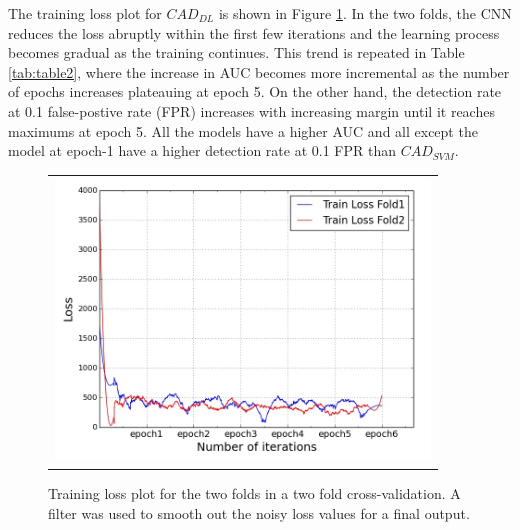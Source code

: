 The training loss plot for $CAD_{DL}$ is shown in Figure \ref{fig:5}. In the two folds, the CNN reduces the loss abruptly within the first few iterations and the learning process becomes gradual as the training continues. This trend is repeated in Table \ref{tab:table2}, where the increase in AUC becomes more incremental as the number of epochs increases plateauing at epoch 5. On the other hand, the detection rate at 0.1 false-postive rate (FPR) increases with increasing margin until it reaches maximums at epoch 5. All the models have a higher AUC and all except the model at epoch-1 have a higher detection rate at 0.1 FPR than $CAD_{SVM}$.

\begin{figure} [ht]
   \begin{center}
   \begin{tabular}{c}
   \includegraphics[height=7.5cm]{Figure5}
   \end{tabular}
   \end{center}
   \caption[Fig5]
   { \label{fig:5} 
Training loss plot for the two folds in a two fold cross-validation. A filter was used to smooth out the noisy loss values for a final output.}
   \end{figure}

